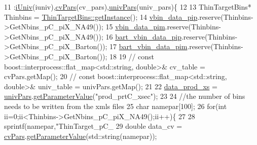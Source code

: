 \begin{DoxyCode}
11                                                                                                            
                            :\hyperlink{class_neutrino_flux_reweight_1_1_thin_targetp_c_pion_reweighter_a59ed15e151960ba8dc990d8c6bbd7567}{iUniv}(iuniv),\hyperlink{class_neutrino_flux_reweight_1_1_thin_targetp_c_pion_reweighter_ad0ab176cd637c51c8ca5d4f87ed93ded}{cvPars}(cv\_pars),\hyperlink{class_neutrino_flux_reweight_1_1_thin_targetp_c_pion_reweighter_afc6d553d64c70f7b98636b2bb8a13b43}{univPars}(univ\_pars)\{
12     
13     ThinTargetBins*  Thinbins =  \hyperlink{class_neutrino_flux_reweight_1_1_thin_target_bins_aeff5cf7220dd08322f5abac2cbc7ff33}{ThinTargetBins::getInstance}();
14     \hyperlink{class_neutrino_flux_reweight_1_1_thin_targetp_c_pion_reweighter_a3602ae8237c0cc7729045b13b90874b4}{vbin\_data\_pip}.reserve(Thinbins->GetNbins\_pC\_piX\_NA49());
15     \hyperlink{class_neutrino_flux_reweight_1_1_thin_targetp_c_pion_reweighter_aea0dca1b93e560e26871da0bdf1ac075}{vbin\_data\_pim}.reserve(Thinbins->GetNbins\_pC\_piX\_NA49());
16     \hyperlink{class_neutrino_flux_reweight_1_1_thin_targetp_c_pion_reweighter_a844e9c7ba521a42ce5ebe5fbb5b2d5f4}{bart\_vbin\_data\_pip}.reserve(Thinbins->GetNbins\_pC\_piX\_Barton());
17     \hyperlink{class_neutrino_flux_reweight_1_1_thin_targetp_c_pion_reweighter_a9d7ffcf3ca0c5a7b0f1c37435cc86403}{bart\_vbin\_data\_pim}.reserve(Thinbins->GetNbins\_pC\_piX\_Barton());
18     
19     \textcolor{comment}{// const boost::interprocess::flat\_map<std::string, double>& cv\_table   = cvPars.getMap();}
20     \textcolor{comment}{// const boost::interprocess::flat\_map<std::string, double>& univ\_table = univPars.getMap();}
21     
22     \hyperlink{class_neutrino_flux_reweight_1_1_thin_targetp_c_pion_reweighter_ae2c5b20aa1823516579b0684d188d75d}{data\_prod\_xs} = \hyperlink{class_neutrino_flux_reweight_1_1_thin_targetp_c_pion_reweighter_afc6d553d64c70f7b98636b2bb8a13b43}{univPars}.\hyperlink{class_neutrino_flux_reweight_1_1_parameter_table_acb7dc8335b65b116f6092f2fa57ca5ed}{getParameterValue}(\textcolor{stringliteral}{"prod\_prtC\_xsec"});
23     
24     \textcolor{comment}{//the number of bins needs to be written from the xmls files }
25     \textcolor{keywordtype}{char} namepar[100];
26     \textcolor{keywordflow}{for}(\textcolor{keywordtype}{int} ii=0;ii<Thinbins->GetNbins\_pC\_piX\_NA49();ii++)\{
27       
28       sprintf(namepar,\textcolor{stringliteral}{"ThinTarget\_pC\_%
29       \textcolor{keywordtype}{double} data\_cv  = \hyperlink{class_neutrino_flux_reweight_1_1_thin_targetp_c_pion_reweighter_ad0ab176cd637c51c8ca5d4f87ed93ded}{cvPars}.\hyperlink{class_neutrino_flux_reweight_1_1_parameter_table_acb7dc8335b65b116f6092f2fa57ca5ed}{getParameterValue}(std::string(namepar));
}
\end{DoxyCode}
